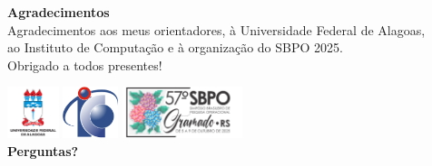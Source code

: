 \documentclass[aspectratio=169,11pt]{beamer}
\begin{document}
\begin{frame}[plain]
    \begin{center}
        {\Large\textbf{Agradecimentos}}\\[0.5cm]

        Agradecimentos aos meus orientadores, à Universidade Federal de Alagoas,\\
        ao Instituto de Computação e à organização do SBPO 2025\@.\\[0.7cm]

        Obrigado a todos presentes!

        \includegraphics[height=1.5cm]{img/ufal.jpg}\hspace{0.5cm}%
        \includegraphics[height=1.5cm]{img/logo-ic.png}\hspace{0.5cm}%
        \includegraphics[height=1.5cm]{img/sbpo2025-header-logo.png}\\[0.7cm]
        
        {\Huge\textbf{Perguntas?}}
    \end{center}
\end{frame}
\end{document}
